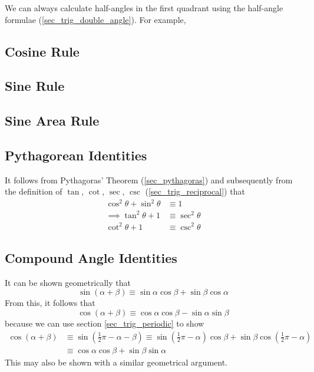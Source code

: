 \documentclass[fleqn,a4paper,11pt]{article}
\begin{document}
    We can always calculate half-angles in the first quadrant using the
    half-angle formulae (\ref{sec_trig_double_angle}). For example, 

    \subsection{Cosine Rule}

    \subsection{Sine Rule}

    \subsection{Sine Area Rule}

    \subsection{Pythagorean Identities} \label{sec_trig_pythag}

    It follows from Pythagoras' Theorem (\ref{sec_pythagoras})
    and subsequently from the definition of
    \(\tan\), \(\cot\), \(\sec\), \(\csc\) (\ref{sec_trig_reciprocal}) that
    \begin{align}
    \cos^2 \theta + \sin^2 \theta &\equiv 1 \\
    \implies \tan^2 \theta + 1 &\equiv \sec^2 \theta \\
    \cot^2 \theta + 1 &\equiv \csc^2 \theta
    \end{align}

    \subsection{Compound Angle Identities} \label{sec_comp_angle}


    It can be shown geometrically that
    \begin{equation}
    \sin(\alpha + \beta) \equiv
       \sin \alpha \cos \beta +  \sin \beta \cos \alpha
    \end{equation}
    From this, it follows that
    \begin{equation}
    \cos(\alpha + \beta) \equiv
       \cos \alpha \cos \beta - \sin \alpha \sin \beta
    \end{equation}
    because we can use section \ref{sec_trig_periodic} to show
    \begin{align*}
    \cos(\alpha + \beta) &\equiv
        \sin(\frac 12 \pi - \alpha - \beta) \equiv
        \sin(\frac 12 \pi - \alpha)\cos \beta +
            \sin \beta \cos(\frac 12 \pi - \alpha) \\
    &\equiv
        \cos \alpha \cos \beta + \sin \beta \sin \alpha
    \end{align*}
    This may also be shown with a similar geometrical argument.
\end{document}
